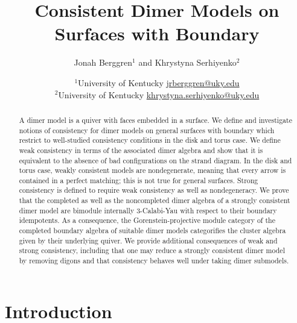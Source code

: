 \documentclass{article}
\title{Consistent Dimer Models on Surfaces with Boundary}
\author{Jonah Berggren$^1$ and Khrystyna Serhiyenko$^2$}
\date{
	$^1$University of Kentucky \href{mailto:jrberggren@uky.edu}{jrberggren@uky.edu} 
	\\
	$^2$University of Kentucky \href{mailto:khrystyna.serhiyenko@uky.edu}{khrystyna.serhiyenko@uky.edu}
}
\theoremstyle{definition}
\begin{document}
\maketitle

\begin{abstract}
	A dimer model is a quiver with faces embedded in a surface. We define and investigate notions of consistency for dimer models on general surfaces with boundary which restrict to well-studied consistency conditions in the disk and torus case. We define weak consistency in terms of the associated dimer algebra and show that it is equivalent to the absence of bad configurations on the strand diagram.  In the disk and torus case, weakly consistent models are nondegenerate, meaning that every arrow is contained in a perfect matching; this is not true for general surfaces. Strong consistency is defined to require weak consistency as well as nondegeneracy. We prove that the completed as well as the noncompleted dimer algebra of a strongly consistent dimer model are bimodule internally 3-Calabi-Yau with respect to their boundary idempotents. As a consequence, the Gorenstein-projective module category of the completed boundary algebra of suitable dimer models categorifies the cluster algebra given by their underlying quiver. We provide additional consequences of weak and strong consistency, including that one may reduce a strongly consistent dimer model by removing digons and that consistency behaves well under taking dimer submodels.
\end{abstract}

\section{Introduction}
\end{document}
